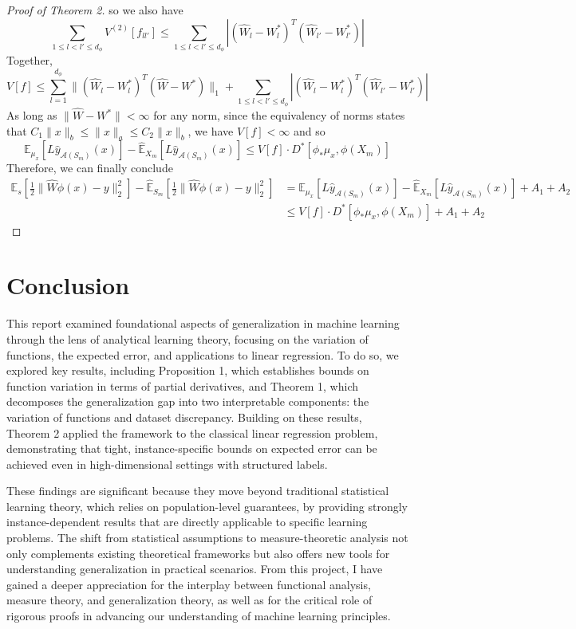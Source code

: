 \documentclass{article}
\begin{document}
\begin{proof}[Proof of Theorem 2]
    so we also have
    \[\sum_{1 \leq l < l' \leq d_\phi} V^{(2)} \left[f_{l l'} \right] \leq \sum_{1 \leq l < l' \leq d_\phi} \left| (\hat{W}_l - W^{*}_l)^T (\hat{W}_{l'} - W^{*}_{l'}) \right| \]
    Together,
    \[V[f] \leq \sum_{l=1}^{d_\phi} \lVert (\hat{W}_l - W^{*}_l)^T (\hat{W} - W^*) \rVert_1 + \sum_{1 \leq l < l' \leq d_\phi} \left| (\hat{W}_l - W^{*}_l)^T (\hat{W}_{l'} - W^{*}_{l'}) \right|\]
    As long as $\lVert \hat{W} - W^* \rVert < \infty $ for any norm, since the equivalency of norms states that $C_1 \lVert x \rVert_b \leq \lVert x \rVert_a \leq C_2 \lVert x \rVert_b$, we have $V[f] < \infty$ and so
    \[\mathbb{E}_{\mu_x} \left[ L\hat{y}_{\mathcal{A}(S_m)} (x) \right] - \hat{\mathbb{E}}_{X_m} \left[L\hat{y}_{\mathcal{A}(S_m)} (x) \right] \leq V[f] \cdot D^*[\phi_{*} \mu_x, \phi(X_m)] \]
    Therefore, we can finally conclude
    \begin{align*}
        \mathbb{E}_{s} \left[ \frac{1}{2} \lVert \hat{W} \phi(x) - y \rVert_{2}^{2} \right] - \hat{\mathbb{E}}_{S_m} \left[ \frac{1}{2} \lVert \hat{W} \phi(x) - y \rVert_{2}^{2} \right] & = \mathbb{E}_{\mu_x} \left[ L\hat{y}_{\mathcal{A}(S_m)} (x) \right] - \hat{\mathbb{E}}_{X_m} \left[L\hat{y}_{\mathcal{A}(S_m)} (x) \right] + A_1 + A_2 \\
        & \leq V[f] \cdot D^* \left[\phi_{*} \mu_{x}, \phi(X_m) \right] + A_1 + A_2
    \end{align*}
\end{proof}


\section{Conclusion}

This report examined foundational aspects of generalization in machine learning through the lens of analytical learning theory, focusing on the variation of functions, the expected error, and applications to linear regression. To do so, we explored key results, including Proposition 1, which establishes bounds on function variation in terms of partial derivatives, and Theorem 1, which decomposes the generalization gap into two interpretable components: the variation of functions and dataset discrepancy. Building on these results, Theorem 2 applied the framework to the classical linear regression problem, demonstrating that tight, instance-specific bounds on expected error can be achieved even in high-dimensional settings with structured labels.

These findings are significant because they move beyond traditional statistical learning theory, which relies on population-level guarantees, by providing strongly instance-dependent results that are directly applicable to specific learning problems. The shift from statistical assumptions to measure-theoretic analysis not only complements existing theoretical frameworks but also offers new tools for understanding generalization in practical scenarios. From this project, I have gained a deeper appreciation for the interplay between functional analysis, measure theory, and generalization theory, as well as for the critical role of rigorous proofs in advancing our understanding of machine learning principles.

\newpage


\end{document}
